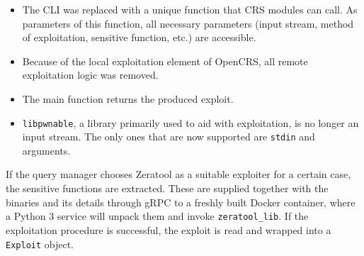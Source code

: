 \documentclass[../main.tex]{subfiles}
\begin{document}
\begin{itemize}
      \tightlist
      \item
            The CLI was replaced with a unique function that CRS modules can call.
            As parameters of this function, all necessary parameters (input
            stream, method of exploitation, sensitive function, etc.) are
            accessible.
      \item
            Because of the local exploitation element of OpenCRS, all remote
            exploitation logic was removed.
      \item
            The main function returns the produced exploit.
      \item
            \texttt{libpwnable}, a library primarily used to aid with
            exploitation, is no longer an input stream. The only ones that are now
            supported are \texttt{stdin} and arguments.
\end{itemize}

If the query manager chooses Zeratool as a suitable exploiter for a certain
case, the sensitive functions are extracted. These are supplied together with
the binaries and its details through gRPC to a freshly built Docker container,
where a Python 3 service will unpack them and invoke \texttt{zeratool\_lib}. If
the exploitation procedure is successful, the exploit is read and wrapped into
a \texttt{Exploit} object.
\end{document}
